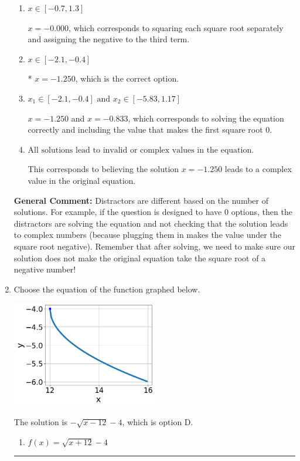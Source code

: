 \documentclass{extbook}[14pt]
\newcommand{\litem}[1]{\item #1

\rule{\textwidth}{0.4pt}}
\begin{document}
\begin{enumerate}
{\begin{enumerate}[label=\Alph*.]
$x = -2.500$ and $x = -0.833$, which corresponds to solving each radical separately for 0.
\item \( x \in [-0.7,1.3] \)

$x = -0.000$, which corresponds to squaring each square root separately and assigning the negative to the third term.
\item \( x \in [-2.1,-0.4] \)

* $x = -1.250$, which is the correct option.
\item \( x_1 \in [-2.1, -0.4] \text{ and } x_2 \in [-5.83,1.17] \)

$x = -1.250$ and $x = -0.833$, which corresponds to solving the equation correctly and including the value that makes the first square root 0.
\item \( \text{All solutions lead to invalid or complex values in the equation.} \)

This corresponds to believing the solution $x = -1.250$ leads to a complex value in the original equation.
\end{enumerate}

\textbf{General Comment:} Distractors are different based on the number of solutions. For example, if the question is designed to have 0 options, then the distractors are solving the equation and not checking that the solution leads to complex numbers (because plugging them in makes the value under the square root negative). Remember that after solving, we need to make sure our solution does not make the original equation take the square root of a negative number!
}
\litem{
Choose the equation of the function graphed below.

\begin{center}
    \includegraphics[width=0.5\textwidth]{../Figures/radicalGraphToEquationC.png}
\end{center}


The solution is \( - \sqrt{x - 12} - 4 \), which is option D.\begin{enumerate}[label=\Alph*.]
\item \( f(x) = \sqrt{x + 12} - 4 \)


\end{enumerate}}
\end{enumerate}
\end{document}

